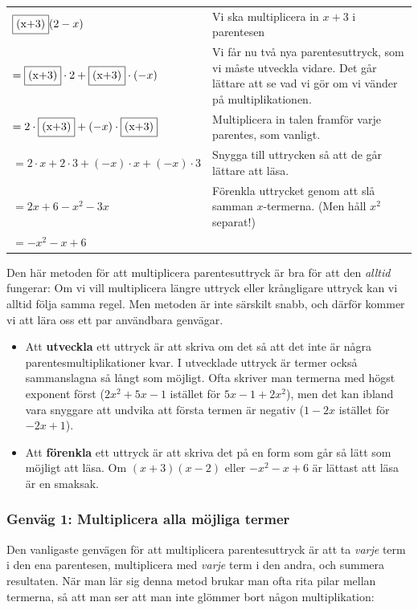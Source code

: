 \smallskip
\begin{tabular}{l|p{5.7cm}}
  $\framebox{(x+3)} (2-x)$ & Vi ska multiplicera in $x+3$ i parentesen \\
  $= \framebox{(x+3)} \cdot 2 + \framebox{(x+3)} \cdot (-x)$ & Vi får nu två nya parentesuttryck, som vi måste utveckla vidare. Det går lättare att se vad vi gör om vi vänder på multiplikationen. \\
  $=2 \cdot \framebox{(x+3)} + (-x) \cdot \framebox{(x+3)}$ & Multiplicera in talen framför varje parentes, som vanligt. \\
  $=2 \cdot x + 2 \cdot 3 + (-x) \cdot x + (-x) \cdot 3$ & Snygga till uttrycken så att de går lättare att läsa. \\
  $=2x + 6 - x^2  - 3x$ & Förenkla uttrycket genom att slå samman $x$-termerna. (Men håll $x^2$ separat!) \\
  $=-x^2 - x + 6$ & \\
\end{tabular}
\smallskip

Den här metoden för att multiplicera parentesuttryck är bra för att den \emph{alltid} fungerar:
Om vi vill multiplicera längre uttryck eller krångligare uttryck kan vi alltid följa samma regel.
Men metoden är inte särskilt snabb, och därför kommer vi att lära oss ett par användbara genvägar.

\begin{itemize}
  \item Att \textbf{utveckla} ett uttryck är att skriva om det så att det inte är några parentesmultiplikationer kvar.
  I utvecklade uttryck är termer också sammanslagna så långt som möjligt.
  Ofta skriver man termerna med högst exponent först ($2x^2+5x-1$ istället för $5x-1+2x^2$), men det kan ibland vara snyggare att undvika att första termen är negativ ($1-2x$ istället för $-2x + 1$).
  \item Att \textbf{förenkla} ett uttryck är att skriva det på en form som går så lätt som möjligt att läsa.
  Om $(x+3)(x-2)$ eller $-x^2 - x + 6$ är lättast att läsa är en smaksak.
\end{itemize}

\subsubsection{Genväg 1: Multiplicera alla möjliga termer}

Den vanligaste genvägen för att multiplicera parentesuttryck är att ta \emph{varje} term i den ena parentesen, multiplicera med \emph{varje} term i den andra, och summera resultaten.
När man lär sig denna metod brukar man ofta rita pilar mellan termerna, så att man ser att man inte glömmer bort någon multiplikation:

